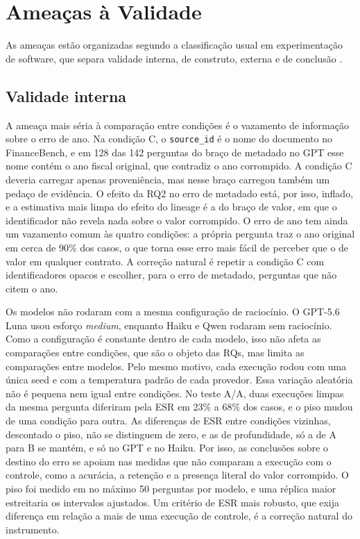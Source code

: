 \section{Ameaças à Validade}\label{sec:ameacas}

As ameaças estão organizadas segundo a classificação usual em experimentação de software, que separa validade interna, de construto, externa e de conclusão \cite{wohlin2012experimentation}.

\subsection{Validade interna}\label{sec:ameacas-interna}

A ameaça mais séria à comparação entre condições é o vazamento de informação sobre o erro de ano.
Na condição C, o \texttt{source\_id} é o nome do documento no FinanceBench, e em 128 das 142 perguntas do braço de metadado no GPT esse nome contém o ano fiscal original, que contradiz o ano corrompido.
A condição C deveria carregar apenas proveniência, mas nesse braço carregou também um pedaço de evidência.
O efeito da RQ2 no erro de metadado está, por isso, inflado, e a estimativa mais limpa do efeito do lineage é a do braço de valor, em que o identificador não revela nada sobre o valor corrompido.
O erro de ano tem ainda um vazamento comum às quatro condições: a própria pergunta traz o ano original em cerca de 90\% dos casos, o que torna esse erro mais fácil de perceber que o de valor em qualquer contrato.
A correção natural é repetir a condição C com identificadores opacos e escolher, para o erro de metadado, perguntas que não citem o ano.

Os modelos não rodaram com a mesma configuração de raciocínio. O GPT-5.6 Luna usou esforço \emph{medium}, enquanto Haiku e Qwen rodaram sem raciocínio.
Como a configuração é constante dentro de cada modelo, isso não afeta as comparações entre condições, que são o objeto das RQs, mas limita as comparações entre modelos.
Pelo mesmo motivo, cada execução rodou com uma única seed e com a temperatura padrão de cada provedor.
Essa variação aleatória não é pequena nem igual entre condições. No teste A/A, duas execuções limpas da mesma pergunta diferiram pela ESR em 23\% a 68\% dos casos, e o piso mudou de uma condição para outra. As diferenças de ESR entre condições vizinhas, descontado o piso, não se distinguem de zero, e as de profundidade, só a de A para B se mantém, e só no GPT e no Haiku. Por isso, as conclusões sobre o destino do erro se apoiam nas medidas que não comparam a execução com o controle, como a acurácia, a retenção e a presença literal do valor corrompido. O piso foi medido em no máximo 50 perguntas por modelo, e uma réplica maior estreitaria os intervalos ajustados. Um critério de ESR mais robusto, que exija diferença em relação a mais de uma execução de controle, é a correção natural do instrumento.

